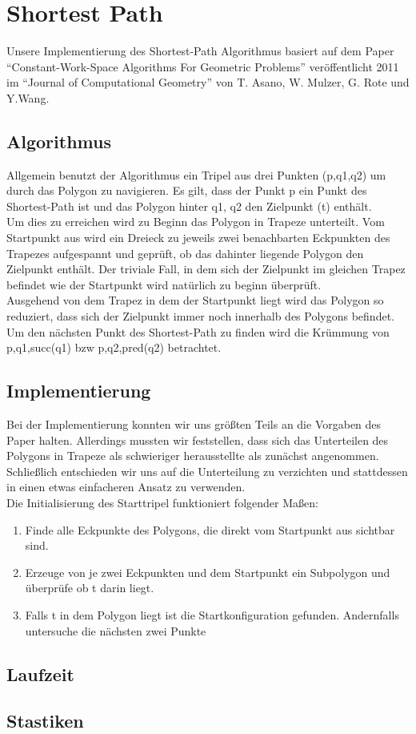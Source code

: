 \section{Shortest Path}
	
Unsere Implementierung des Shortest-Path Algorithmus basiert auf dem Paper \enquote{Constant-Work-Space Algorithms For Geometric Problems} veröffentlicht 2011 im \enquote{Journal of Computational Geometry} von T. Asano, W. Mulzer, G. Rote und Y.Wang. 

\subsection{Algorithmus}

Allgemein benutzt der Algorithmus ein Tripel aus drei Punkten (p,q1,q2) um durch das Polygon zu navigieren. Es gilt, dass der Punkt p ein Punkt des Shortest-Path ist und das Polygon hinter q1, q2 den Zielpunkt (t) enthält.\\
Um dies zu erreichen wird zu Beginn das Polygon in Trapeze unterteilt. Vom Startpunkt aus wird ein Dreieck zu jeweils zwei benachbarten Eckpunkten des Trapezes aufgespannt und geprüft, ob das dahinter liegende Polygon den Zielpunkt enthält. Der triviale Fall, in dem sich der Zielpunkt im gleichen Trapez befindet wie der Startpunkt wird natürlich zu beginn überprüft.\\
Ausgehend von dem Trapez in dem der Startpunkt liegt wird das Polygon so reduziert, dass sich der Zielpunkt immer noch innerhalb des Polygons befindet. Um den nächsten Punkt des Shortest-Path zu finden wird die Krümmung von p,q1,succ(q1) bzw p,q2,pred(q2) betrachtet.

\subsection{Implementierung}

Bei der Implementierung konnten wir uns größten Teils an die Vorgaben des Paper halten. Allerdings mussten wir feststellen, dass sich das Unterteilen des Polygons in Trapeze als schwieriger herausstellte als zunächst angenommen. Schließlich entschieden wir uns auf die Unterteilung zu verzichten und stattdessen in einen etwas einfacheren Ansatz zu verwenden.\\
Die Initialisierung des Starttripel funktioniert folgender Maßen:

\begin{enumerate}
\item Finde alle Eckpunkte des Polygons, die direkt vom Startpunkt aus sichtbar sind.
\item Erzeuge von je zwei Eckpunkten und dem Startpunkt ein Subpolygon und überprüfe ob t darin liegt.
\item Falls t in dem Polygon liegt ist die Startkonfiguration gefunden. Andernfalls untersuche die nächsten zwei Punkte
\end{enumerate}

\subsection{Laufzeit}
\subsection{Stastiken}